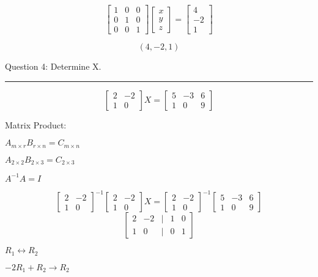 \documentclass[a4paper,11pt,twoside]{report}
\begin{document}
\[\begin{bmatrix} 1 & 0 & 0 \\ 0 & 1 & 0 \\ 0 & 0 & 1 \end{bmatrix}
\begin{bmatrix} x \\ y \\ z \end{bmatrix} =
\begin{bmatrix} 4 \\ -2 \\ 1 \end{bmatrix} \]

\[\boxed{\left( 4, -2, 1 \right) }\]



\noindent Question 4: Determine X. \\ \hrule

\[\begin{bmatrix} 2 & -2 \\ 1 & 0 \end{bmatrix} X = \begin{bmatrix} 5 & -3 & 6 \\ 1 & 0 & 9 \end{bmatrix} \]

Matrix Product:

$A_{m\times r} B_{r\times n} = C_{m\times n}$

$A_{2\times 2} B_{2\times 3} = C_{2\times 3}$

$A^{-1}A = I$

\[\begin{bmatrix} 2 & -2 \\ 1 & 0 \end{bmatrix}^{-1} \begin{bmatrix} 2 & -2 \\ 1 & 0 \end{bmatrix} X = \begin{bmatrix} 2 & -2 \\ 1 & 0 \end{bmatrix}^{-1}\begin{bmatrix} 5 & -3 & 6 \\ 1 & 0 & 9 \end{bmatrix} \]
\[	\begin{bmatrix} 2 & -2 & | & 1 & 0 \\ 1 & 0 & | & 0 & 1\end{bmatrix}	\]

$R_1 \leftrightarrow R_2$

$-2R_1 + R_2 \to R_2$
\end{document}
